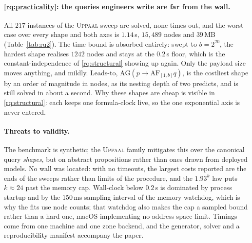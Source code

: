 

\paragraph{\ref{rq:practicality}: the queries engineers write are far from the wall.}
All $217$ instances of the \textsc{Uppaal} sweep are solved, none times out, and the worst case over
every shape and both axes is $1.14$\,s, $15{,}489$ nodes and $39$\,MB (Table~\ref{tab:rq2}). The time
bound is absorbed entirely: swept to $b=2^{20}$, the hardest shape realises $1242$ nodes and stays at
the $0.2$\,s floor, which is the constant-independence of \ref{rq:structural} showing up again. Only
the payload size moves anything, and mildly. Leads-to,
$\mathrm{AG}(p\rightarrow\mathrm{AF}_{[1,b]}q)$, is the costliest shape by an order of magnitude in
nodes, as its nesting depth of two predicts, and is still solved in about a second. Why these shapes
are cheap is visible in \ref{rq:structural}: each keeps one formula-clock live, so the one
exponential axis is never entered.

\paragraph{Threats to validity.}
The benchmark is synthetic; the \textsc{Uppaal} family mitigates this over the canonical query
\emph{shapes}, but on abstract propositions rather than ones drawn from deployed models. No wall was
located: with no timeouts, the largest costs reported are the ends of the sweeps rather than limits
of the procedure, and the $1.93^{k}$ law puts $k\approx24$ past the memory cap. Wall-clock below
$0.2$\,s is dominated by process startup and by the $150$\,ms sampling interval of the memory
watchdog, which is why the fits use node counts; that watchdog also makes the cap a sampled bound
rather than a hard one, macOS implementing no address-space limit. Timings come from one machine and
one zone backend, and the generator, solver and a reproducibility manifest accompany the paper.
